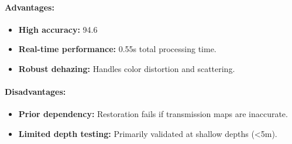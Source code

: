 \paragraph{Advantages:}
\begin{itemize}
    \item \textbf{High accuracy:} 94.6%
    \item \textbf{Real-time performance:} 0.55s total processing time.
    \item \textbf{Robust dehazing:} Handles color distortion and scattering.
\end{itemize}

\paragraph{Disadvantages:}
\begin{itemize}
    \item \textbf{Prior dependency:} Restoration fails if transmission maps are inaccurate.
    \item \textbf{Limited depth testing:} Primarily validated at shallow depths (\textless5m).
\end{itemize}